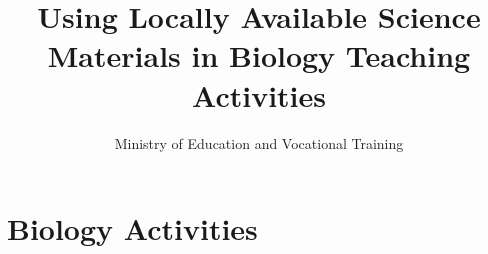 \documentclass[12pt,a4paper]{book}
\author{Ministry of Education and Vocational Training}
\title{Using Locally Available Science Materials in Biology Teaching Activities }
\begin{document}




\tableofcontents







\chapter{Biology Activities}









\end{document}
